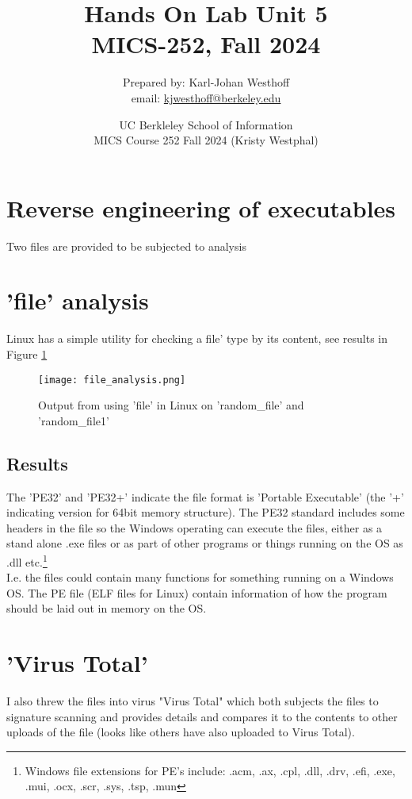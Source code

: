 \documentclass[
	letterpaper, %
	10pt, %
	unnumberedsections, %
	twoside, %
]{APAAssignment}
\title{Hands On Lab Unit 5 \\ MICS-252, Fall 2024} %
\date{UC Berkleley School of Information \\
MICS Course 252 Fall 2024 (Kristy Westphal)
}
\author{
	Prepared by: Karl-Johan Westhoff \\
	email: \href{mailto:kjwesthoff@berkeley.edu}{kjwesthoff@berkeley.edu}
}
\begin{document}
\onecolumn
\maketitle %



\section{Reverse engineering of executables}\label{log-analysis}
Two files are provided to be subjected to analysis

\section{'file' analysis}
Linux has a simple utility for checking a file' type by its content, see results in Figure \ref{fig:fileAnalysis}
\begin{figure}[!htp] %
	\centering
	\texttt{[image: file\_analysis.png]}
	\caption{Output from using 'file' in Linux on 'random\_file' and 'random\_file1'}
	\label{fig:fileAnalysis}
\end{figure}

\subsection{Results} The 'PE32' and 'PE32+' indicate the file format is 'Portable Executable' (the '+' indicating version for 64bit memory structure)\cite{PE32Wikipedia}. The PE32 standard includes some headers in the file so the Windows operating can execute the files, either as a stand alone .exe files or as part of other programs or things running on the OS as .dll etc.\footnote{Windows file extensions for PE's include: .acm, .ax, .cpl, .dll, .drv, .efi, .exe, .mui, .ocx, .scr, .sys, .tsp, .mun\cite{PE32Wikipedia}} \\
I.e. the files could contain many functions for something running on a Windows OS. The PE file (ELF files for Linux) contain information of how the program should be laid out in memory on the OS.

\section{'Virus Total'}
I also threw the files into virus "Virus Total"\cite{VirusTotal} which both subjects the files to signature scanning and provides details and compares it to the contents to other uploads of the file (looks like others have also uploaded to Virus Total).
\end{document}
